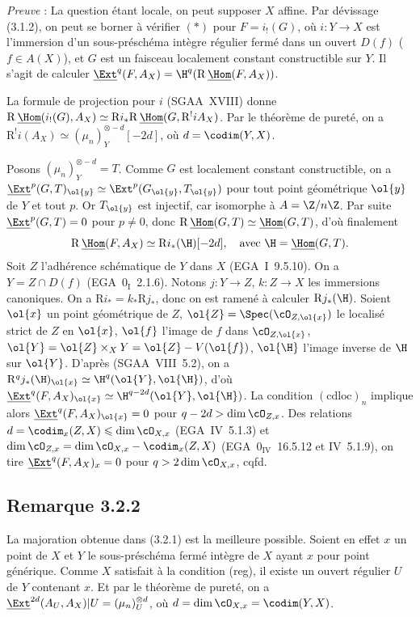 \emph{Preuve} : La question étant locale, on peut supposer $X$ affine. Par dévissage (3.1.2), on peut se borner à vérifier $(*)$ pour $F = i_{!}(G)$, où $i : Y \to X$ est l'immersion d'un sous-préschéma intègre régulier fermé dans un ouvert $D(f)$ ($f \in A(X)$), et $G$ est un faisceau localement constant
constructible sur $Y$. Il s'agit de calculer $\underline{\Ext}^q(F, A_X) = \H^q(\mathrm{R}\,\underline{\Hom}(F, A_X))$.

La formule de projection pour $i$ (SGAA~XVIII) donne $\mathrm{R}\,\underline{\Hom}(i_{!}(G), A_X) \simeq \mathrm{R} i_{*} \mathrm{R}\,\underline{\Hom}(G, \mathrm{R}^{!}iA_X)$. Par le théorème de pureté, on a $\mathrm{R}^{!}i(A_X) \simeq (\mu_n)^{\otimes -d}_Y[-2d]$, où $d = \codim(Y,X)$.

Posons $(\mu_n)^{\otimes -d}_Y = T$. Comme $G$ est localement constant constructible, on a $\underline{\Ext}^p(G,T)_{\ol{y}} \simeq \Ext^p(G_{\ol{y}}, T_{\ol{y}})$ pour tout point géométrique $\ol{y}$ de $Y$ et tout $p$. Or $T_{\ol{y}}$ est injectif, car isomorphe à $A = \Z/n\Z$. Par suite $\underline{\Ext}^p(G,T) = 0$ pour $p \neq 0$, donc $\mathrm{R}\,\underline{\Hom}(G,T) \simeq \underline{\Hom}(G,T)$, d'où finalement
\[
\mathrm{R}\,\underline{\Hom}(F, A_X) \simeq \mathrm{R} i_{*}(\H)[-2d], \quad \text{avec } \H = \underline{\Hom}(G,T).
\]
Soit $Z$ l'adhérence schématique de $Y$ dans $X$ (EGA~I~9.5.10). On a $Y = Z \cap D(f)$ (EGA~$0_{\mathrm{I}}$~2.1.6). Notons $j : Y \to Z$, $k : Z \to X$ les immersions canoniques. On a $\mathrm{R} i_{*} = k_{*} \mathrm{R} j_{*}$, donc on est ramené à calculer $\mathrm{R} j_{*}(\H)$. Soient $\ol{x}$ un point géométrique de $Z$, $\ol{Z} = \Spec(\cO_{Z,\ol{x}})$ le localisé strict de $Z$ en $\ol{x}$, $\ol{f}$ l'image de $f$ dans $\cO_{Z,\ol{x}}$, $\ol{Y} = \ol{Z} \times_X Y = \ol{Z} - V(\ol{f})$, $\ol{\H}$ l'image inverse de $\H$ sur $\ol{Y}$. D'après (SGAA~VIII~5.2), on a $\mathrm{R}^q j_{*}(\H)_{\ol{x}} \simeq \H^q(\ol{Y}, \ol{\H})$, d'où $\underline{\Ext}^q(F, A_X)_{\ol{x}} \simeq \H^{q-2d}(\ol{Y}, \ol{\H})$. La condition $(\mathrm{cdloc})_n$ implique alors $\underline{\Ext}^q(F, A_X)_{\ol{x}} = 0$ pour $q - 2d > \dim \cO_{Z,x}$. Des relations $d = \codim_{x}(Z,X) \leqslant \dim \cO_{X,x}$ (EGA~IV~5.1.3) et $\dim \cO_{Z,x} = \dim \cO_{X,x} - \codim_{x}(Z,X)$ (EGA~$0_{\mathrm{IV}}$~16.5.12 et IV~5.1.9), on tire $\underline{\Ext}^q(F, A_X)_x = 0$ pour $q > 2\dim \cO_{X,x}$, cqfd.

\subsection*{Remarque 3.2.2}
La majoration obtenue dans (3.2.1) est la meilleure possible. Soient en effet $x$ un point de $X$ et $Y$ le sous-préschéma fermé intègre de $X$ ayant $x$ pour point générique. Comme $X$ satisfait à la condition (reg), il existe un ouvert régulier $U$ de $Y$
contenant $x$. Et par le théorème de 
pureté, on a $\underline{\Ext}^{2d}(A_U, A_X)|U = (\mu_n)^{\otimes d}_U$, où $d = \dim \cO_{X,x} = \codim(Y,X)$.

